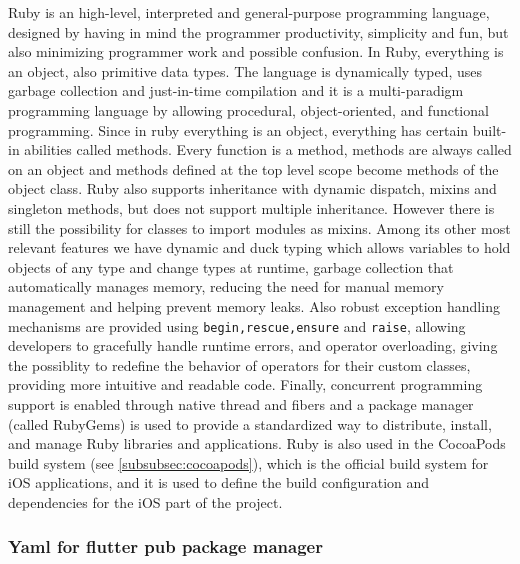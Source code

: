 Ruby is an high-level, interpreted and general-purpose programming language, designed by having in mind the programmer productivity, simplicity and fun, but also minimizing programmer work and possible confusion. In Ruby, everything is an object, also primitive data types. The language is dynamically typed, uses garbage collection and just-in-time compilation and it is a multi-paradigm programming language by allowing procedural, object-oriented, and functional programming. Since in ruby everything is an object, everything has certain built-in abilities called methods. Every function is a method, methods are always called on an object and methods defined at the top level scope become methods of the object class. Ruby also supports inheritance with dynamic dispatch, mixins and singleton methods, but does not support multiple inheritance. However there is still the possibility for classes to import modules as mixins. Among its other most relevant features we have dynamic and duck typing which allows variables to hold objects of any type and change types at runtime, garbage collection that automatically manages memory, reducing the need for manual memory management and helping prevent memory leaks. Also robust exception handling mechanisms are provided using \texttt{begin,rescue,ensure} and \texttt{raise}, allowing developers to gracefully handle runtime errors, and operator overloading, giving the possiblity to redefine the behavior of operators for their custom classes, providing more intuitive and readable code. Finally, concurrent programming support is enabled through native thread and fibers and a package manager (called RubyGems) is used to provide a standardized way to distribute, install, and manage Ruby libraries and applications\cite{Ruby}. Ruby is also used in the CocoaPods build system (see \cref{subsubsec:cocoapods}), which is the official build system for iOS applications, and it is used to define the build configuration and dependencies for the iOS part of the project.
\subsubsection{Yaml for flutter pub package manager}

